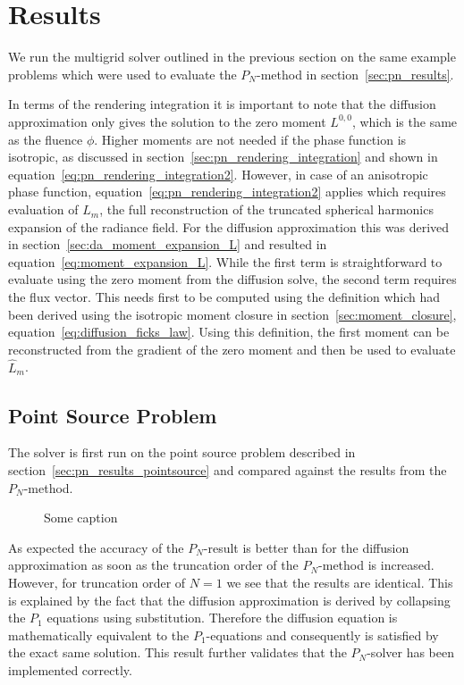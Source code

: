 \section{Results}
\label{sec:da_results}

We run the multigrid solver outlined in the previous section on the same example problems which were used to evaluate the $P_N$-method in section~\ref{sec:pn_results}.

In terms of the rendering integration it is important to note that the diffusion approximation only gives the solution to the zero moment $L^{0,0}$, which is the same as the fluence $\phi$. Higher moments are not needed if the phase function is isotropic, as discussed in section~\ref{sec:pn_rendering_integration} and shown in equation~\ref{eq:pn_rendering_integration2}. However, in case of an anisotropic phase function, equation~\ref{eq:pn_rendering_integration2} applies which requires evaluation of $\widehat{L}_m$, the full reconstruction of the truncated spherical harmonics expansion of the radiance field. For the diffusion approximation this was derived in section~\ref{sec:da_moment_expansion_L} and resulted in equation~\ref{eq:moment_expansion_L}. While the first term is straightforward to evaluate using the zero moment from the diffusion solve, the second term requires the flux vector. This needs first to be computed using the definition which had been derived using the isotropic moment closure in section~\ref{sec:moment_closure}, equation~\ref{eq:diffusion_ficks_law}. Using this definition, the first moment can be reconstructed from the gradient of the zero moment and then be used to evaluate $\widehat{L}_m$.

\subsection{Point Source Problem}
\label{sec:da_results_pointsource}

The solver is first run on the point source problem described in section~\ref{sec:pn_results_pointsource} and compared against the results from the $P_N$-method.
\begin{figure}[h]
\centering
{}
\caption{Some caption}
\label{fig:da_results_pointsource_1}
\end{figure}

As expected the accuracy of the $P_N$-result is better than for the diffusion approximation as soon as the truncation order of the $P_N$-method is increased. However, for truncation order of $N=1$ we see that the results are identical. This is explained by the fact that the diffusion approximation is derived by collapsing the $P_1$ equations using substitution. Therefore the diffusion equation is mathematically equivalent to the $P_1$-equations and consequently is satisfied by the exact same solution. This result further validates that the $P_N$-solver has been implemented correctly.

